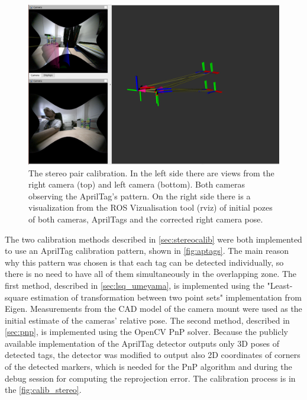\begin{figure}[h]
    \centering
    \includegraphics[width=.8\textwidth]{graphics/calib_process.png}
    \caption[The stereocamera calibration process]{The stereo pair calibration. In the left side there are views from the right camera (top) and left camera (bottom). Both cameras observing the AprilTag's pattern. On the right side there is a visualization from the ROS Vizualisation tool (rviz) of initial pozes of both cameras, AprilTags and the corrected right camera pose.}
    \label{fig:calib_stereo}
\end{figure}

The two calibration methods described in \autoref{sec:stereocalib} were both implemented to use an AprilTag calibration pattern, shown in \autoref{fig:aptags}.
The main reason why this pattern was chosen is that each tag can be detected individually, so there is no need to have all of them simultaneously in the overlapping zone.
The first method, described in \autoref{sec:lsq_umeyama}, is implemented using the "Least-square estimation of transformation between two point sets" \cite{Umeyama1991} implementation from Eigen.
Measurements from the CAD model of the camera mount were used as the initial estimate of the cameras' relative pose.
The second method, described in \autoref{sec:pnp}, is implemented using the OpenCV PnP solver.
Because the publicly available implementation of the AprilTag detector outputs only 3D poses of detected tags, the detector was modified to output also 2D coordinates of corners of the detected markers, which is needed for the PnP algorithm and during the debug session for computing the reprojection error.
The calibration process is in the \autoref{fig:calib_stereo}.

